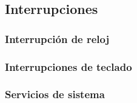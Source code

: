 \subsection{Interrupciones}

\subsubsection{Interrupción de reloj}

\subsubsection{Interrupciones de teclado}

\subsubsection{Servicios de sistema}

